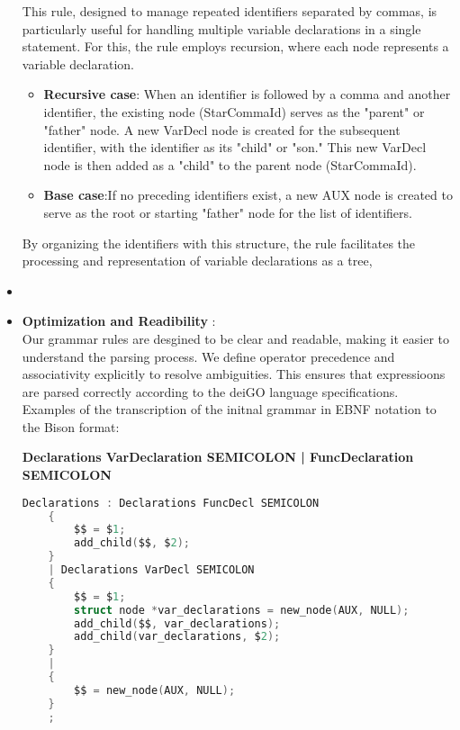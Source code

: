 \documentclass[12pt]{article}
\begin{document}
\begin{itemize}
    This rule, designed to manage repeated identifiers separated by commas, is particularly useful for handling multiple variable declarations in a single statement. For this, the rule employs recursion, where each node represents a variable declaration.   
    \begin{itemize}
        \item \textbf{Recursive case}:  When an identifier is followed by a comma and another identifier, the existing node (StarCommaId) serves as the "parent" or "father" node. A new VarDecl node is created for the subsequent identifier, with the identifier as its "child" or "son." This new VarDecl node is then added as a "child" to the parent node (StarCommaId).
        \item \textbf{Base case}:If no preceding identifiers exist, a new AUX node is created to serve as the root or starting "father" node for the list of identifiers.
    \end{itemize}
    By organizing the identifiers with this structure, the rule facilitates the processing and representation of variable declarations as a tree,
    \item 
    \item \textbf{Optimization and Readibility }: \\ Our grammar rules are desgined to be clear and readable, making it easier to understand the parsing process. We define operator precedence and associativity explicitly to resolve ambiguities. This ensures that expressioons are parsed correctly according to the deiGO language specifications.
    \\Examples of the transcription of the initnal grammar in EBNF notation to the Bison format:
    \begin{center}
        \small\textbf{Declarations \textendash{} VarDeclaration SEMICOLON | FuncDeclaration SEMICOLON}
    \end{center}
    \begin{center}
    \begin{lstlisting}[language=C, basicstyle=\small\ttfamily]
Declarations : Declarations FuncDecl SEMICOLON
    {
        $$ = $1;
        add_child($$, $2);
    }              
    | Declarations VarDecl SEMICOLON
    {
        $$ = $1;
        struct node *var_declarations = new_node(AUX, NULL);
        add_child($$, var_declarations);
        add_child(var_declarations, $2);
    }
    | 
    {
        $$ = new_node(AUX, NULL);
    }
    ;
    \end{lstlisting}
    \end{center}

\end{itemize}
\end{document}
